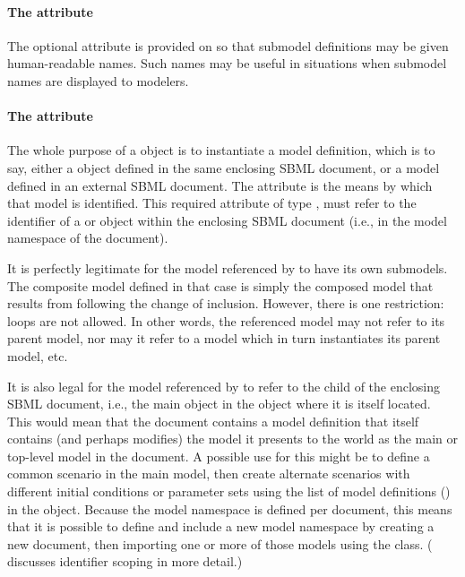 \paragraph{The \fixttspace{} attribute}

The optional  attribute is provided on \Submodel so that
submodel definitions may be given human-readable names.  Such names may
be useful in situations when submodel names are displayed to modelers.


\paragraph{The \fixttspace{} attribute}
\label{submodel-modelref}
  
The whole purpose of a \Submodel object is to instantiate a model
definition, which is to say, either a \Model object defined in the same
enclosing SBML document, or a model defined in an external SBML
document.  The  attribute is the means by which that
model is identified.  This required attribute of type ,
must refer to the identifier of a \Model or \ExternalModelDefinition
object within the enclosing SBML document (i.e., in the model namespace
of the document).

It is perfectly legitimate for the model referenced by 
to have its own submodels.  The composite model defined in that case is
simply the composed model that results from following the change of
inclusion.  However, there is one restriction: loops are not allowed.
In other words, the referenced model may not refer to its parent model,
nor may it refer to a model which in turn instantiates its parent model,
etc.

It is also legal for the model referenced by  to refer
to the  child of the enclosing SBML document, i.e., the
main \Model object in the \SBML object where it is itself located.  This
would mean that the document contains a model definition that itself
contains (and perhaps modifies) the model it presents to the world as
the main or top-level model in the document.  A possible use for this
might be to define a common scenario in the main model, then create
alternate scenarios with different initial conditions or parameter sets
using the list of model definitions () in the
\SBML object.  Because the model namespace is defined per document, this
means that it is possible to define and include a new model namespace by
creating a new document, then importing one or more of those models
using the \ExternalModelDefinition class.  ( discusses
identifier scoping in more detail.)


